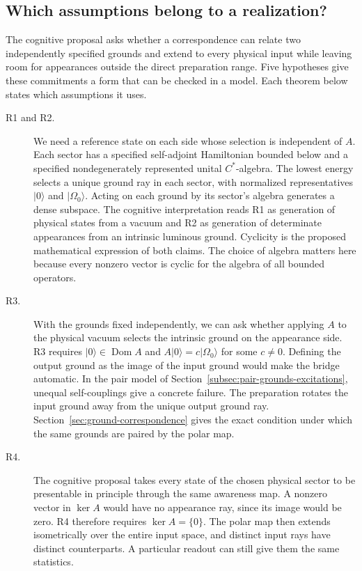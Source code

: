 \documentclass[11pt]{article}
\theoremstyle{definition}
\newcommand{\ket}[1]{\lvert #1\rangle}
\begin{document}
\subsection*{Which assumptions belong to a realization?}
The cognitive proposal asks whether a correspondence can relate two independently specified grounds and extend to every physical input while leaving room for appearances outside the direct preparation range. Five hypotheses give these commitments a form that can be checked in a model. Each theorem below states which assumptions it uses.
\begin{description}
\item[R1 and R2.] We need a reference state on each side whose selection is independent of $A$. Each sector has a specified self-adjoint Hamiltonian bounded below and a specified nondegenerately represented unital $C^*$-algebra. The lowest energy selects a unique ground ray in each sector, with normalized representatives $\ket{0}$ and $\ket{\Omega_0}$. Acting on each ground by its sector's algebra generates a dense subspace. The cognitive interpretation reads R1 as generation of physical states from a vacuum and R2 as generation of determinate appearances from an intrinsic luminous ground. Cyclicity is the proposed mathematical expression of both claims. The choice of algebra matters here because every nonzero vector is cyclic for the algebra of all bounded operators.
\item[R3.] With the grounds fixed independently, we can ask whether applying $A$ to the physical vacuum selects the intrinsic ground on the appearance side. R3 requires $\ket{0}\in\operatorname{Dom}A$ and $A\ket{0}=c\ket{\Omega_0}$ for some $c\ne0$. Defining the output ground as the image of the input ground would make the bridge automatic. In the pair model of Section~\ref{subsec:pair-grounds-excitations}, unequal self-couplings give a concrete failure. The preparation rotates the input ground away from the unique output ground ray. Section~\ref{sec:ground-correspondence} gives the exact condition under which the same grounds are paired by the polar map.
\item[R4.] The cognitive proposal takes every state of the chosen physical sector to be presentable in principle through the same awareness map. A nonzero vector in $\ker A$ would have no appearance ray, since its image would be zero. R4 therefore requires $\ker A=\{0\}$. The polar map then extends isometrically over the entire input space, and distinct input rays have distinct counterparts. A particular readout can still give them the same statistics.

\end{description}
\end{document}
